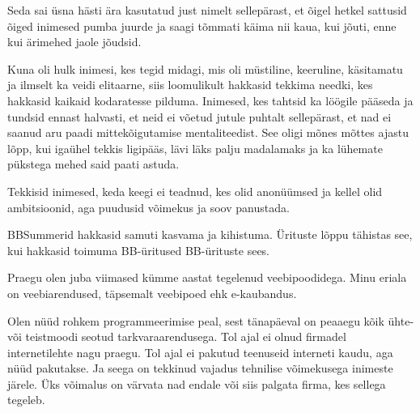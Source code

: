 
Seda sai üsna hästi ära kasutatud just nimelt sellepärast, et õigel hetkel sattusid õiged inimesed pumba juurde ja saagi tõmmati 
käima nii kaua, kui jõuti, enne kui ärimehed jaole jõudsid. 

Kuna oli hulk inimesi, kes tegid midagi, mis oli 
müstiline, keeruline, käsitamatu ja ilmselt ka veidi elitaarne, siis loomulikult hakkasid 
tekkima needki, kes hakkasid kaikaid kodaratesse pilduma. Inimesed, 
kes tahtsid ka löögile pääseda ja tundsid ennast halvasti, et neid ei 
võetud jutule puhtalt sellepärast, et nad ei saanud aru paadi mittekõigutamise 
mentaliteedist. See oligi mõnes mõttes ajastu lõpp, kui igaühel 
tekkis ligipääs, lävi läks palju madalamaks ja ka lühemate pükstega mehed said 
paati astuda.

Tekkisid inimesed, keda keegi ei teadnud, kes olid anonüümsed ja kellel olid 
ambitsioonid, aga puudusid võimekus ja soov panustada. 

BBSummerid hakkasid samuti kasvama ja kihistuma. Ürituste lõppu tähistas see, kui hakkasid toimuma BB-üritused BB-ürituste sees. 


Praegu olen juba viimased kümme aastat tegelenud veebipoodidega. Minu eriala on 
veebiarendused, täpsemalt veebipoed ehk e-kaubandus. 

Olen nüüd rohkem programmeerimise peal, sest tänapäeval on 
peaaegu kõik ühte- või teistmoodi seotud tarkvaraarendusega. Tol ajal ei 
olnud firmadel internetilehte nagu praegu. Tol ajal ei pakutud teenuseid 
interneti kaudu, aga nüüd pakutakse. Ja seega on tekkinud vajadus tehnilise võimekusega inimeste järele. Üks võimalus on värvata nad 
endale või siis palgata firma, kes sellega tegeleb.